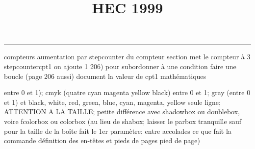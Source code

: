 \documentclass[11pt]{article}%
\title{\bf \vspace{-1cm} HEC 1999} %
\author{} %
\date{} %
\renewcommand{\headrulewidth}{0pt}%
\renewcommand{\footrulewidth}{0.4pt}%
\begin{document}
\maketitle %
\vspace{-1.2cm}\hrule %
\thispagestyle{fancy}

\vspace*{.4cm}


compteurs%
aumentation par stepcounter du compteur section%
met le compteur à 3%
stepcounter{cpt1} on ajoute 1%
206) pour subordonner à une condition %
faire une boucle (page 206 aussi) %
document la valeur de cpt1 
mathématiques\newcommand{\ch}{\operatorname{ch}} 
\newcommand{\sh}{\operatorname{sh}}
\renewcommand{\tanh}{\operatorname{th}}
\renewcommand{\sinh}{\operatorname{sh}}
\renewcommand{\cosh}{\operatorname{ch}}
\newcommand{\argsh}{\operatorname{argsh}}
\newcommand{\argch}{\operatorname{argch}}
\newcommand{\argth}{\operatorname{argth}}
\newcommand{\Id}{\operatorname{Id}}
\renewcommand{\leq}{\leq}
\renewcommand{\geq}{\geq }

\newcommand{\dlim}{\lim}
\newcommand{\dsum}{\sum}
\newcommand{\dprod}{\prod}



entre 0 et 1); cmyk (quatre cyan magenta yellow black) entre 0 et 1;
gray (entre 0 et 1) et black, white, red, green, blue, cyan, magenta,
yellow%
seule ligne; ATTENTION A LA TAILLE; petite différence avec shadowbox ou
doublebox, voire fcolorbox ou colorbox (au lieu de shabox; laisser le
parbox tranquille sauf pour la taille de la boîte
\newcommand{\Tbox}[1]{\begin{center} \shabox{\parbox{0.6
\linewidth}{#1}} \end{center}} %
fait le 1er paramètre; entre accolades ce que fait la commande
définition des en-têtes et pieds de pages\pagestyle{fancy}
\chead{}
\rfoot[ \ \thepage]{\thepage}
\cfoot{}
\lfoot{}
\thispagestyle{fancy} %
pied de page)\renewcommand{\footrulewidth}{0.4pt}
\renewcommand{\headrulewidth}{0.4pt}
\end{document}
